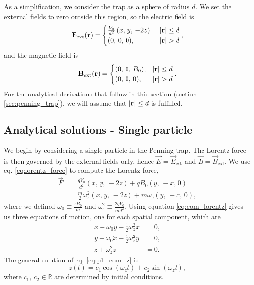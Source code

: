 As a simplification, we consider the trap as a sphere of radius $d$. We set the external fields to zero outside this region, so the electric field is   
\begin{equation}\label{eq:trap_ext_E_field}
    \mathbf{E}_\mathrm{ext} (\mathbf{r}) = 
    \begin{cases}
        \frac{V_0}{d^2} \left( x,\, y,\, -2z \right), & \abs{\mathbf{r}} \leq d \\
        (0,\,0,\,0),  & \abs{\mathbf{r}} > d
    \end{cases}, 
\end{equation}
and the magnetic field is 
\begin{equation}\label{eq:trap_ext_B_field}
    \mathbf{B}_\mathrm{ext} (\mathbf{r}) = 
    \begin{cases}
        (0,\,0,\,B_0), & \abs{\mathbf{r}} \leq d \\
        (0,\,0,\,0), & \abs{\mathbf{r}} > d
    \end{cases}.
\end{equation}
For the analytical derivations that follow in this section (section \ref{sec:penning_trap}), we will assume that $\abs{\mathbf{r}}\leq d$ is fulfilled.  

\subsection{Analytical solutions - Single particle}\label{subsec_methods:single_particle_analytical}
We begin by considering a single particle in the Penning trap. The Lorentz force is then governed by the external fields only, hence $\vec{E} = \vec{E}_\mathrm{ext}$ and $\vec{B} = \vec{B}_\mathrm{ext}$. We use eq. \eqref{eq:lorentz_force} to compute the Lorentz force, 
\begin{align}
    \vec{F} &= \frac{q V_0}{d^2}(x,\,y,\,-2z) + q B_0 (\dot{y},\,-\dot{x},\,0) \nonumber\\
    &= \frac{m}{2}\omega_z^2 (x,\,y,\,-2z) + m \omega_0 (\dot{y},\,-\dot{x},\,0),\label{eq:p1_lorentz_force_penning}
\end{align}
where we defined $\omega_0 \equiv \frac{qB_0}{m}$ and $\omega_z^2 \equiv \frac{2qV_0}{m d^2}$. Using equation \eqref{eq:eom_lorentz} gives us three equations of motion, one for each spatial component, which are 
\begin{subequations}\label{eq:p1_eom_xyz}
    \begin{align}
        \ddot{x} - \omega_0 \dot{y} - \frac{1}{2} \omega_z^2 x &= 0, \label{eq:p1_eom_x} \\ 
        \ddot{y} + \omega_0 \dot{x} - \frac{1}{2} \omega_z^2 y &= 0, \label{eq:p1_eom_y} \\ 
        \ddot{z} + \omega_z^2 z &= 0. \label{eq:p1_eom_z}
    \end{align}
\end{subequations}
The general solution of eq. \eqref{eq:p1_eom_z} is
\begin{equation}
    z(t) = c_1 \cos(\omega_z t) + c_2 \sin(\omega_z t), \label{eq:p1_diffeq_solution_z}
\end{equation}
where $c_1,\, c_2 \in \mathbb{R}$ are determined by initial conditions.


